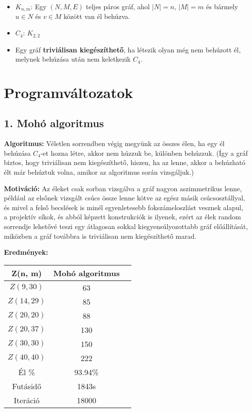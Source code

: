 \documentclass[12pt,a4paper]{article}
\begin{document}
\begin{itemize}
    \item $K_{n,m}$: Egy $(N,M,E)$ teljes páros gráf, ahol $|N|=n$, $|M|=m$ és bármely $u \in N$ és $v \in M$ között van él behúzva.
    \item $C_4$: $K_{2,2}$
    \item Egy gráf \textbf{triviálisan kiegészíthető}, ha létezik olyan még nem behúzott él, melynek behúzása után nem keletkezik $C_4$.
\end{itemize}

\section*{Programváltozatok}

\subsection*{1. Mohó algoritmus}
\textbf{Algoritmus:} Véletlen sorrendben végig megyünk az összes élen, ha egy él behúzása $C_4$-et hozna létre, akkor nem húzzuk be, különben behúzzuk. (Így a gráf biztos, hogy triviálisan nem kiegészíthető, hiszen, ha az lenne, akkor a behúzható élt már behúztuk volna, amikor az algoritmus során vizsgáljuk.)

\textbf{Motiváció:} Az éleket csak sorban vizsgálva a gráf nagyon aszimmetrikus lenne, például az elsőnek vizsgált csúcs össze lenne kötve az egész másik csúcsosztállyal, és mivel a felső becslések is minél egyenletesebb fokszámeloszlást vesznek alapul, a projektív síkok, és abból képzett konstrukciók is ilyenek, ezért az élek random sorrendje lehetővé teszi egy átlagosan sokkal kiegyensúlyozottabb gráf előállítását, miközben a gráf továbbra is triviálisan nem kiegészíthető marad.

\textbf{Eredmények:}
\begin{table}[H]
\centering
\begin{tabular}{|c|c|c|}
\hline
\textbf{Z(n, m)} & \textbf{Mohó algoritmus} \\
\hline
$Z(9,30)$  & 63 \\
$Z(14, 29)$ & 85 \\
$Z(20, 20)$ & 88 \\
$Z(20, 37)$ & 130 \\
$Z(30, 30)$ & 150 \\
$Z(40, 40)$ & 222 \\
\hline
Él \% & 93.94\% \\
\hline
Futásidő & 1843s \\
Iteráció & 18000 \\
\hline
\end{tabular}
\end{table}
\end{document}
